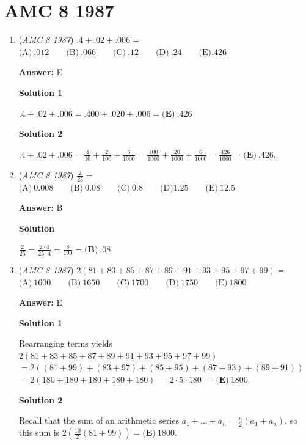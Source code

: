 \section{AMC 8 1987}
        \begin{enumerate}
        	\item (\textit{AMC 8 1987}) $.4+.02+.006=$
$\text{(A)}\ .012 \qquad \text{(B)}\ .066 \qquad \text{(C)}\ .12 \qquad \text{(D)}\ .24 \qquad \text{(E)} .426$

 \textbf{Answer: }E



\textbf{Solution 1}

$.4+.02+.006 = .400+.020+.006 = \boxed{\textbf{(E)}\ .426}$




\textbf{Solution 2}

$.4 + .02 + .006 = \frac{4}{10} + \frac{2}{100} + \frac{6}{1000} = \frac{400}{1000} + \frac{20}{1000} + \frac{6}{1000} = \frac{426}{1000} = \boxed{\textbf{(E)}\ .426}$.

 


	\item (\textit{AMC 8 1987}) $\frac{2}{25}=$
$\text{(A)}\ 0.008 \qquad \text{(B)}\ 0.08 \qquad \text{(C)}\ 0.8 \qquad \text{(D)} 1.25 \qquad \text{(E)}\ 12.5$

 \textbf{Answer: }B



\textbf{Solution}

$\frac{2}{25}=\frac{2\cdot 4}{25\cdot 4} = \frac{8}{100} = \boxed{\textbf{(B)}\ .08}$



	\item (\textit{AMC 8 1987}) $2(81+83+85+87+89+91+93+95+97+99)=$
$\text{(A)}\ 1600 \qquad \text{(B)}\ 1650 \qquad \text{(C)}\ 1700 \qquad \text{(D)}\ 1750 \qquad \text{(E)}\ 1800$

 \textbf{Answer: }E



\textbf{Solution 1}

Rearranging terms yields $2(81 + 83 + 85 + 87 + 89 + 91 + 93 + 95 + 97 + 99)$ $= 2((81 + 99) + (83 + 97) + (85 + 95) + (87 + 93) + (89 + 91))$
$= 2 (180 + 180 + 180 + 180 + 180)$ $= 2 \cdot 5 \cdot 180$ $= \boxed{\textbf{(E)}\ 1800}$.

 



\textbf{Solution 2}

Recall that the sum of an arithmetic series $a_1 + ... + a_n = \frac{n}{2}(a_1 + a_n)$, so this sum is $2\left(\frac{10}{2}(81 + 99)\right) = \boxed{\textbf{(E)}\ 1800}$.


\end{enumerate}
